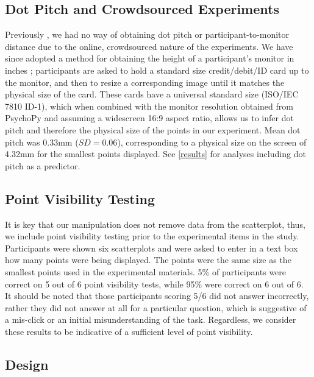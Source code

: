 \documentclass{vgtc}                          %
\begin{document}
\hypertarget{dot-pitch-and-crowdsourced-experiments}{%
\subsection{Dot Pitch and Crowdsourced Experiments}\label{dot-pitch-and-crowdsourced-experiments}}

Previously \cite{strain_2023}, we had no way of obtaining dot pitch
or participant-to-monitor distance due to the online, crowdsourced nature of the
experiments. We have since adopted a method for obtaining the height of a
participant's monitor in inches \cite{screenscale}; participants are asked to hold a standard size
credit/debit/ID card up to the monitor, and then to resize a corresponding image until
it matches the physical size of the card. These cards have a universal
standard size (ISO/IEC 7810 ID-1), which when combined with
the monitor resolution obtained from PsychoPy \cite{pierce_psychopy_2019}
and assuming a widescreen 16:9 aspect ratio,
allows us to infer dot pitch and therefore the physical size of the points in our
experiment. Mean dot pitch was 0.33mm (\(SD = 0.06\)),
corresponding to a physical size on the screen of 4.32mm
for the smallest points displayed. See \autoref{results} for analyses including dot pitch as a predictor.

\hypertarget{point-visibility-testing}{%
\subsection{Point Visibility Testing}\label{point-visibility-testing}}

It is key that our manipulation does not remove data from the scatterplot,
thus, we include point visibility testing prior to the experimental items in the study.
Participants were shown six scatterplots
and were asked to enter in a text box how many points
were being displayed. The points were the same size as the smallest points used
in the experimental materials. 5\% of
participants were correct on 5 out of 6 point
visibility tests, while 95\% were correct
on 6 out of 6. It should be noted that those
participants scoring 5/6 did not answer incorrectly, rather they did not answer
at all for a particular question, which is suggestive of
a mis-click or an initial misunderstanding of the task. Regardless,
we consider these results to be indicative of a sufficient level of
point visibility.

\hypertarget{design}{%
\subsection{Design}\label{design}}
\end{document}

